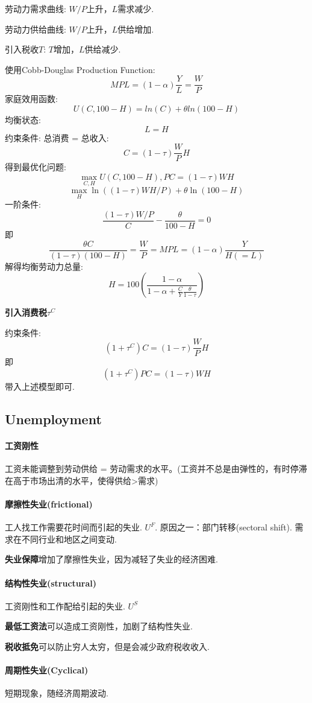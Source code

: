 \documentclass[UTF8, onecolumn, a4paper, 12pt]{article}
\begin{document}
劳动力需求曲线: $W/P$上升，$L$需求减少.

劳动力供给曲线: $W/P$上升，$L$供给增加.

引入税收$T$: $T$增加，$L$供给减少.

使用Cobb-Douglas Production Function:
$$MPL = (1-\alpha)\frac{Y}{L} = \frac{W}{P}$$
家庭效用函数:
$$U(C, 100-H) = ln(C) + \theta ln(100-H)$$
均衡状态:
$$L = H$$
约束条件:
总消费 = 总收入:
$$C = (1-\tau)\frac{W}{P}H$$
得到最优化问题:
$$\max_{C, H}U(C, 100-H), PC = (1-\tau)WH$$
$$\max_{H} \ln((1-\tau)WH/P) + \theta\ln(100-H)$$
一阶条件:
$$\frac{(1-\tau)W/P}{C} - \frac{\theta}{100 - H} = 0$$
即
$$\frac{\theta C}{(1-\tau)(100 - H)} = \frac{W}{P} = MPL = (1-\alpha)\frac{Y}{H(=L)}$$
解得均衡劳动力总量:
$$H = 100\left(\frac{1-\alpha}{1 - \alpha + \frac{C}{Y}\frac{\theta}{1-\tau}}\right)$$

\textbf{引入消费税$\tau^C$}

约束条件:
$$(1+\tau^C)C = (1-\tau)\frac{W}{P}H$$
即$$(1+\tau^C)PC = (1-\tau)WH$$
带入上述模型即可.

\subsection{Unemployment}
\paragraph{工资刚性}
工资未能调整到劳动供给 =  劳动需求的水平。(工资并不总是由弹性的，有时停滞在高于市场出清的水平，使得供给>需求)
\paragraph{摩擦性失业(frictional)} 工人找工作需要花时间而引起的失业. $U^F$.
 原因之一：部门转移(sectoral shift). 需求在不同行业和地区之间变动.
 
\textbf{ 失业保障}增加了摩擦性失业，因为减轻了失业的经济困难.
\paragraph{结构性失业(structural)} 工资刚性和工作配给引起的失业. $U^S$

\textbf{最低工资法}可以造成工资刚性，加剧了结构性失业.

\textbf{税收抵免}可以防止穷人太穷，但是会减少政府税收收入.

\paragraph{周期性失业(Cyclical)}
短期现象，随经济周期波动.
\end{document}
